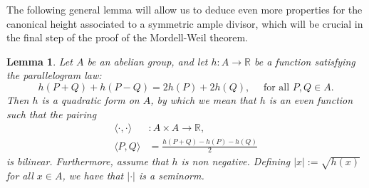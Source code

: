 \documentclass[a4paper, 12pt]{amsart}
\theoremstyle{definition}
\theoremstyle{plain}
\theoremstyle{plain}
\theoremstyle{plain}
\newtheorem{lemma0}[defn0]{Lemma}
\theoremstyle{plain}
\theoremstyle{remark}
\theoremstyle{remark}
\theoremstyle{plain}
\newenvironment{lemma}{ \begin{lemma0}}{\end{lemma0}}
\begin{document}
	The following general lemma will allow us to deduce even more properties for the canonical height associated to a symmetric ample divisor, which will be crucial in the final step of the proof of the Mordell-Weil theorem.
	\begin{lemma}\label{parallelogram}
		Let $A$ be an abelian group, and let $h:A\rightarrow\mathbb{R}$ be a function satisfying the parallelogram law:
		\begin{equation*}
			h(P+Q)+h(P-Q)=2h(P)+2h(Q),\quad\text{ for all } P,Q\in A.
		\end{equation*}
		Then $h$ is a quadratic form on $A$, by which we mean that $h$ is an even function such that the pairing
		\begin{align*}
			\langle\cdot,\cdot\rangle &:A\times A\rightarrow\mathbb{R},\\
			\langle P,Q\rangle&=\frac{h(P+Q)-h(P)-h(Q)}{2}
		\end{align*}
		is bilinear. Furthermore, assume that $h$ is non negative. Defining $|x|:=\sqrt{h(x)}$ for all $x\in A$, we have that $|\cdot|$ is a seminorm.
	\end{lemma}
\end{document}
